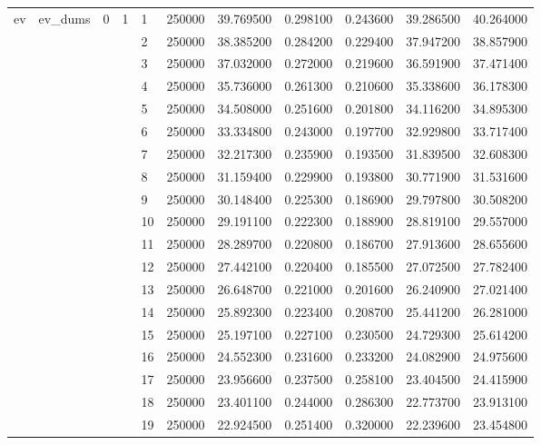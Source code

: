 \begin{tabular}{llllllrrrrr}
\multirow[t]{202}{*}{ev} & \multirow[t]{202}{*}{ev_dums} & \multirow[t]{101}{*}{0} & \multirow[t]{25}{*}{1} & 1 & 250000 & 39.769500 & 0.298100 & 0.243600 & 39.286500 & 40.264000 \\
\cline{5-11}
 &  &  &  & 2 & 250000 & 38.385200 & 0.284200 & 0.229400 & 37.947200 & 38.857900 \\
\cline{5-11}
 &  &  &  & 3 & 250000 & 37.032000 & 0.272000 & 0.219600 & 36.591900 & 37.471400 \\
\cline{5-11}
 &  &  &  & 4 & 250000 & 35.736000 & 0.261300 & 0.210600 & 35.338600 & 36.178300 \\
\cline{5-11}
 &  &  &  & 5 & 250000 & 34.508000 & 0.251600 & 0.201800 & 34.116200 & 34.895300 \\
\cline{5-11}
 &  &  &  & 6 & 250000 & 33.334800 & 0.243000 & 0.197700 & 32.929800 & 33.717400 \\
\cline{5-11}
 &  &  &  & 7 & 250000 & 32.217300 & 0.235900 & 0.193500 & 31.839500 & 32.608300 \\
\cline{5-11}
 &  &  &  & 8 & 250000 & 31.159400 & 0.229900 & 0.193800 & 30.771900 & 31.531600 \\
\cline{5-11}
 &  &  &  & 9 & 250000 & 30.148400 & 0.225300 & 0.186900 & 29.797800 & 30.508200 \\
\cline{5-11}
 &  &  &  & 10 & 250000 & 29.191100 & 0.222300 & 0.188900 & 28.819100 & 29.557000 \\
\cline{5-11}
 &  &  &  & 11 & 250000 & 28.289700 & 0.220800 & 0.186700 & 27.913600 & 28.655600 \\
\cline{5-11}
 &  &  &  & 12 & 250000 & 27.442100 & 0.220400 & 0.185500 & 27.072500 & 27.782400 \\
\cline{5-11}
 &  &  &  & 13 & 250000 & 26.648700 & 0.221000 & 0.201600 & 26.240900 & 27.021400 \\
\cline{5-11}
 &  &  &  & 14 & 250000 & 25.892300 & 0.223400 & 0.208700 & 25.441200 & 26.281000 \\
\cline{5-11}
 &  &  &  & 15 & 250000 & 25.197100 & 0.227100 & 0.230500 & 24.729300 & 25.614200 \\
\cline{5-11}
 &  &  &  & 16 & 250000 & 24.552300 & 0.231600 & 0.233200 & 24.082900 & 24.975600 \\
\cline{5-11}
 &  &  &  & 17 & 250000 & 23.956600 & 0.237500 & 0.258100 & 23.404500 & 24.415900 \\
\cline{5-11}
 &  &  &  & 18 & 250000 & 23.401100 & 0.244000 & 0.286300 & 22.773700 & 23.913100 \\
\cline{5-11}
 &  &  &  & 19 & 250000 & 22.924500 & 0.251400 & 0.320000 & 22.239600 & 23.454800 \\

\end{tabular}
